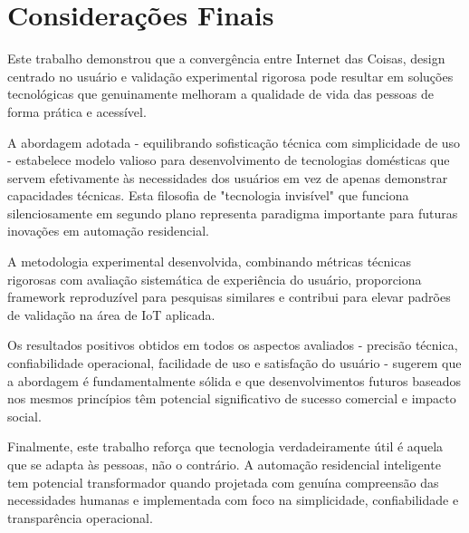 \documentclass[oneside,english,brazilian]{UNISINOSmonografia}
\begin{document}
\section{Considerações Finais}

Este trabalho demonstrou que a convergência entre Internet das Coisas, design centrado no usuário e validação experimental rigorosa pode resultar em soluções tecnológicas que genuinamente melhoram a qualidade de vida das pessoas de forma prática e acessível.

A abordagem adotada - equilibrando sofisticação técnica com simplicidade de uso - estabelece modelo valioso para desenvolvimento de tecnologias domésticas que servem efetivamente às necessidades dos usuários em vez de apenas demonstrar capacidades técnicas. Esta filosofia de "tecnologia invisível" que funciona silenciosamente em segundo plano representa paradigma importante para futuras inovações em automação residencial.

A metodologia experimental desenvolvida, combinando métricas técnicas rigorosas com avaliação sistemática de experiência do usuário, proporciona framework reproduzível para pesquisas similares e contribui para elevar padrões de validação na área de IoT aplicada.

Os resultados positivos obtidos em todos os aspectos avaliados - precisão técnica, confiabilidade operacional, facilidade de uso e satisfação do usuário - sugerem que a abordagem é fundamentalmente sólida e que desenvolvimentos futuros baseados nos mesmos princípios têm potencial significativo de sucesso comercial e impacto social.

Finalmente, este trabalho reforça que tecnologia verdadeiramente útil é aquela que se adapta às pessoas, não o contrário. A automação residencial inteligente tem potencial transformador quando projetada com genuína compreensão das necessidades humanas e implementada com foco na simplicidade, confiabilidade e transparência operacional.


\nocite{lima2019,volkmann2022,silva2019,almeida2020, pacete2022iot, fbi2025_smart_home_sa, berte, nunes_2025_jardim_inteligente, santos_lima_iot_2020, pereira2021, arduino, domingues2013, berte_schuh_2025_biofilico}  %


\end{document}
